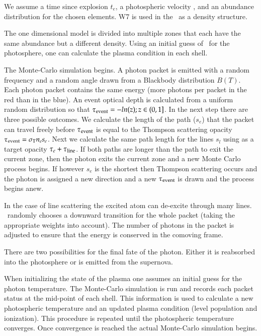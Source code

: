 We assume a time since explosion $t_e$, a photospheric velocity \vph, \lbol and an abundance distribution for the chosen elements. W7 \citep{1984ApJ...286..644N} is used in the \mlc\ as a density structure.

The one dimensional model is divided into multiple zones that each have the same abundance but a different density. 
Using an initial guess of \teff\ for the photosphere, one can calculate the plasma condition in each shell. 

The Monte-Carlo simulation begins. A photon packet is emitted with a random frequency and a random angle drawn from a Blackbody distribution $B(T)$. Each photon packet contains the same energy (more photons per packet in the red than in the blue). 
An event optical depth is calculated from a uniform random distribution so that $\tau_{\rm event}=-ln(z); z \in (0,1]$.  
In the next step there are three possible outcomes. We calculate the length of the path ($s_e$) that the packet can travel freely before $\tau_{\rm event}$ is equal to the Thompson scattering opacity $\tau_{\rm event} = \sigma_{\rm T} n_e s_e$. Next we calculate the same path length for the lines $s_l$ using as a target opacity $\tau_e + \tau_{\rm line}$. 
If both paths are longer than the path to exit the current zone, then the photon exits the current zone and a new Monte Carlo process begins. 
If however $s_e$ is the shortest then Thompson scattering occurs and the photon is assigned a new direction and a new $\tau_{\rm event}$ is drawn and the process begins anew.

In the case of line scattering the excited atom can de-excite through many lines. \mlc\ randomly chooses a downward transition for the whole packet (taking the appropriate weights into account). The number of photons in the packet is adjusted to ensure that the energy is conserved in the comoving frame. 

There are two possibilities for the final fate of the photon. Either it is reabsorbed into the photosphere or is emitted from the supernova. 

When initializing the state of the plasma one assumes an initial guess for the photon temperature. The Monte-Carlo simulation is run and records each packet status at the mid-point of each shell. This information is used to calculate a new photospheric temperature and an updated plasma condition (level population and ionization). 
This procedure is repeated until the photospheric temperature converges. Once convergence is reached the actual Monte-Carlo simulation begins. 

